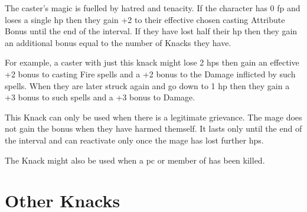 \begin{multicols}{2}
The caster's magic is fuelled by hatred and tenacity.
If the character has 0 \gls{fp} and loses a single \gls{hp} then they gain +2 to their effective chosen casting Attribute Bonus until the end of the \gls{interval}.
If they have lost half their \gls{hp} then they gain an additional bonus equal to the number of Knacks they have.

For example, a caster with just this knack might lose 2 \glspl{hp} then gain an effective +2 bonus to casting Fire spells and a +2 bonus to the Damage inflicted by such spells.
When they are later struck again and go down to 1 \gls{hp} then they gain a +3 bonus to such spells and a +3 bonus to Damage.

This Knack can only be used when there is a legitimate grievance.
The mage does not gain the bonus when they have harmed themself.
It lasts only until the end of the \gls{interval} and can reactivate only once the mage has lost further \glspl{hp}.

The Knack might also be used when a \gls{pc} or member of  has been killed.

\end{multicols}

\section{Other Knacks}

